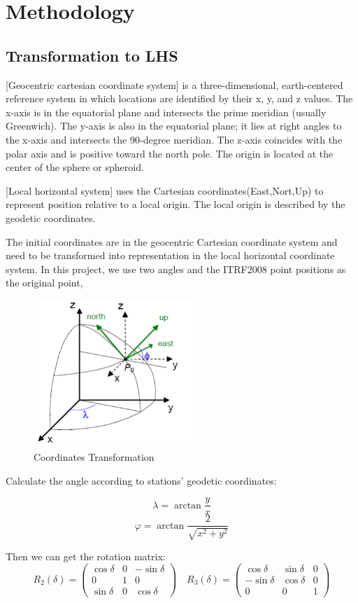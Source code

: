 \documentclass{article}
\begin{document}
\section{Methodology}
\subsection{Transformation to LHS}
[Geocentric cartesian coordinate system] is a three-dimensional, earth-centered reference system in which locations are identified by their x, y, and z values. 
The x-axis is in the equatorial plane and intersects the prime meridian (usually Greenwich). 
The y-axis is also in the equatorial plane; it lies at right angles to the x-axis and intersects the 90-degree meridian. 
The z-axis coincides with the polar axis and is positive toward the north pole. The origin is located at the center of the sphere or spheroid.

[Local horizontal system] uses the Cartesian coordinates(East,Nort,Up) to represent position relative to a local origin. The local origin is described by the geodetic coordinates.

The initial coordinates are in the geocentric Cartesian coordinate system and need to be transformed into representation in the local horizontal coordinate system.
In this project, we use two angles and the ITRF2008 point positions as the original point, 
\begin{figure}[htbp]
  \centering
  \includegraphics[width=6cm]{../source/transform.png}
  \caption{Coordinates Transformation}
  \label{fig:2lhs}
\end{figure}

Calculate the angle according to stations' geodetic coordinates:\vspace{5pt}

$$\lambda=\arctan\frac{y}{x}$$ 
$$\varphi=\arctan\frac{2}{\sqrt{x^{2}+y^{2}}}$$

Then we can get the rotation matrix:\vspace{5pt}
$$R_2(\delta)=\begin{pmatrix}\cos\delta&0&-\sin\delta\\0&1&0\\\sin\delta&0&\cos\delta\end{pmatrix}\quad R_3(\delta)= \begin{pmatrix}\cos\delta&\sin\delta&0\\-\sin\delta&\cos\delta&0\\0&0&1\end{pmatrix}$$
\end{document}

